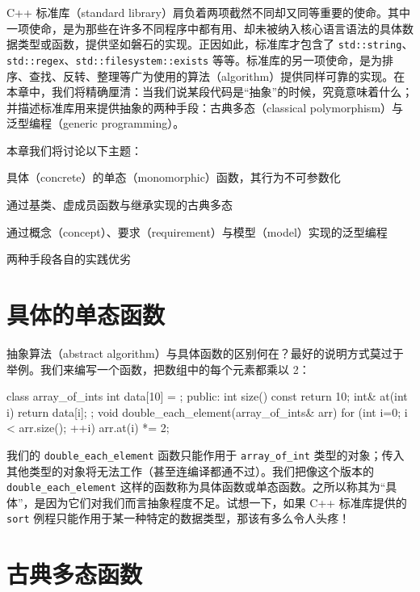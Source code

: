 C++ 标准库（standard library）肩负着两项截然不同却又同等重要的使命。其中一项使命，是为那些在许多不同程序中都有用、却未被纳入核心语言语法的具体数据类型或函数，提供坚如磐石的实现。正因如此，标准库才包含了 \texttt{std::\allowbreak{}string}、\texttt{std::\allowbreak{}regex}、\texttt{std::\allowbreak{}filesystem::\allowbreak{}exists} 等等。标准库的另一项使命，是为排序、查找、反转、整理等广为使用的算法（algorithm）提供同样可靠的实现。在本章中，我们将精确厘清：当我们说某段代码是“抽象”的时候，究竟意味着什么；并描述标准库用来提供抽象的两种手段：古典多态（classical polymorphism）与泛型编程（generic programming）。

本章我们将讨论以下主题：

具体（concrete）的单态（monomorphic）函数，其行为不可参数化

通过基类、虚成员函数与继承实现的古典多态

通过概念（concept）、要求（requirement）与模型（model）实现的泛型编程

两种手段各自的实践优劣

\section{具体的单态函数}

抽象算法（abstract algorithm）与具体函数的区别何在？最好的说明方式莫过于举例。我们来编写一个函数，把数组中的每个元素都乘以 2：

\begin{codebox}[cpp]
    class array_of_ints {
      int data[10] = {};
      public:
        int size() const { return 10; }
        int& at(int i) { return data[i]; }
    };
    void double_each_element(array_of_ints& arr)
    {
      for (int i=0; i < arr.size(); ++i) {
        arr.at(i) *= 2;
      }
    }
\end{codebox}

我们的 \texttt{double\_\allowbreak{}each\_\allowbreak{}element} 函数只能作用于 \texttt{array\_\allowbreak{}of\_\allowbreak{}int} 类型的对象；传入其他类型的对象将无法工作（甚至连编译都通不过）。我们把像这个版本的 \texttt{double\_\allowbreak{}each\_\allowbreak{}element} 这样的函数称为具体函数或单态函数。之所以称其为“具体”，是因为它们对我们而言抽象程度不足。试想一下，如果 C++ 标准库提供的 \texttt{sort} 例程只能作用于某一种特定的数据类型，那该有多么令人头疼！

\section{古典多态函数}

